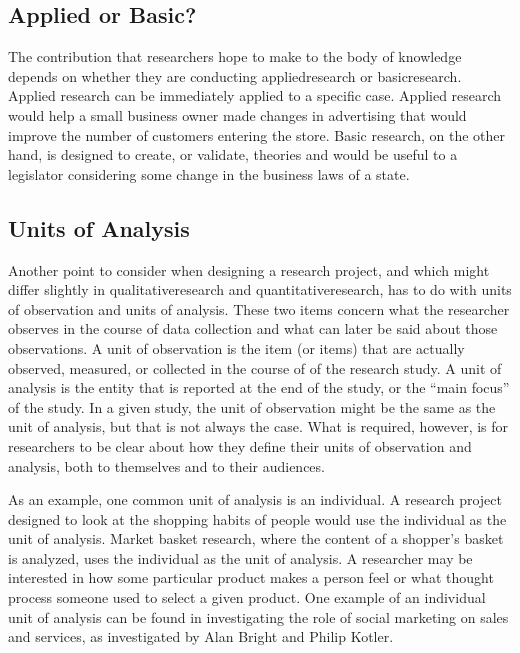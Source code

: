 \subsection{Applied or Basic?}

The contribution that researchers hope to make to the body of knowledge depends on whether they are conducting \gls{appliedresearch} or \gls{basicresearch}. Applied research can be immediately applied to a specific case. Applied research would help a small business owner made changes in advertising that would improve the number of customers entering the store. Basic research, on the other hand, is designed to create, or validate, theories and would be useful to a legislator considering some change in the business laws of a state.

\subsection{Units of Analysis}

Another point to consider when designing a research project, and which might differ slightly in \gls{qualitativeresearch} and \gls{quantitativeresearch}, has to do with units of observation and units of analysis. These two items concern what the researcher observes in the course of data collection and what can later be said about those observations. A unit of observation is the item (or items) that are actually observed, measured, or collected in the course of of the research study. A unit of analysis is the entity that is reported at the end of the study, or the ``main focus'' of the study. In a given study, the unit of observation might be the same as the unit of analysis, but that is not always the case. What is required, however, is for researchers to be clear about how they define their units of observation and analysis, both to themselves and to their audiences.

As an example, one common unit of analysis is an individual. A research project designed to look at the shopping habits of people would use the individual as the unit of analysis. Market basket research, where the content of a shopper's basket is analyzed, uses the individual as the unit of analysis. A researcher may be interested in how some particular product makes a person feel or what thought process someone used to select a given product. One example of an individual unit of analysis can be found in investigating the role of social marketing on sales and services, as investigated by Alan Bright\cite{bright2000role} and Philip Kotler\cite{kotler1989social}.

